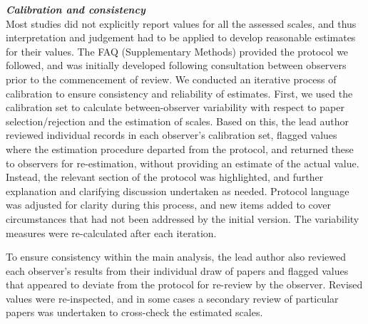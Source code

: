 \documentclass[12pt]{article}
\begin{document}
\vspace{5pt}
\noindent \textbf{\emph{Calibration and consistency}}\\
Most studies did not explicitly report values for all the assessed scales, and thus interpretation and judgement had to be applied to develop reasonable estimates for their values. The FAQ (Supplementary Methods) provided the protocol we followed, and was initially developed following consultation between observers prior to the commencement of review. We conducted an iterative process of calibration to ensure consistency and reliability of estimates. First, we used the calibration set to calculate between-observer variability with respect to paper selection/rejection and the estimation of scales.  Based on this, the lead author reviewed individual records in each observer's calibration set, flagged values where the estimation procedure departed from the protocol, and returned these to observers for re-estimation, without providing an estimate of the actual value. Instead, the relevant section of the protocol was highlighted, and further explanation and clarifying discussion undertaken as needed. Protocol language was adjusted for clarity during this process, and new items added to cover circumstances that had not been addressed by the initial version. The variability measures were re-calculated after each iteration.  

To ensure consistency within the main analysis, the lead author also reviewed each observer's results from their individual draw of papers and flagged values that appeared to deviate from the protocol for re-review by the observer. Revised values were re-inspected, and in some cases a secondary review of particular papers was undertaken to cross-check the estimated scales.   
\end{document}
